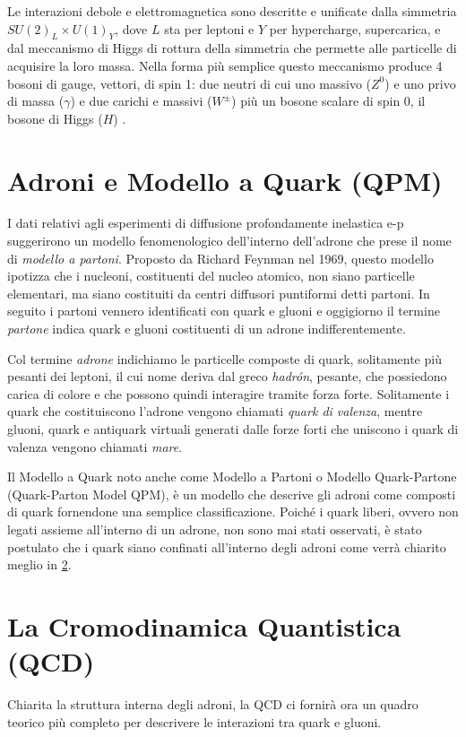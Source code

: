     Le interazioni debole e elettromagnetica sono descritte e unificate dalla simmetria $SU(2)_L \times U(1)_Y$, dove $L$ sta per leptoni e $Y$ per hypercharge, supercarica, e dal meccanismo di Higgs di rottura della simmetria che permette alle particelle di acquisire la loro massa. Nella forma più semplice questo meccanismo produce 4 bosoni di gauge, vettori, di spin 1: due neutri di cui uno massivo ($Z^0$) e uno privo di massa ($\gamma$) e due carichi e massivi ($W^\pm$) più un bosone scalare di spin 0, il bosone di Higgs ($H$) \cite{Vitale_1995}.

    \newpage

\section{Adroni e Modello a Quark (QPM)}
    I dati relativi agli esperimenti di diffusione profondamente inelastica e-p suggerirono un modello fenomenologico dell'interno dell'adrone che prese il nome di \textit{modello a partoni}. Proposto da Richard Feynman nel 1969, questo modello ipotizza che i nucleoni, costituenti del nucleo atomico, non siano particelle elementari, ma siano costituiti da centri diffusori puntiformi detti partoni. In seguito i partoni vennero identificati con quark e gluoni e oggigiorno il termine \textit{partone} indica quark e gluoni costituenti di un adrone indifferentemente.
    
    Col termine \textit{adrone} indichiamo le particelle composte di quark, solitamente più pesanti dei leptoni, il cui nome deriva dal greco \textit{hadrón}, pesante, che possiedono carica di colore e che possono quindi interagire tramite forza forte. Solitamente i quark che costituiscono l'adrone vengono chiamati \textit{quark di valenza}, mentre gluoni, quark e antiquark virtuali generati dalle forze forti che uniscono i quark di valenza vengono chiamati \textit{mare}.

    Il Modello a Quark noto anche come Modello a Partoni o Modello Quark-Partone (Quark-Parton Model QPM), è un modello che descrive gli adroni come composti di quark fornendone una semplice classificazione. Poiché i quark liberi, ovvero non legati assieme all'interno di un adrone, non sono mai stati osservati, è stato postulato che i quark siano confinati all'interno degli adroni come verrà chiarito meglio in \ref{QCD}.

\section{La Cromodinamica Quantistica (QCD)}
\label{QCD}
    Chiarita la struttura interna degli adroni, la QCD ci fornirà ora un quadro teorico più completo per descrivere le interazioni tra quark e gluoni.

